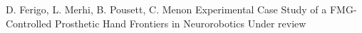 \vspace{1mm}

\begin{cventries}

	\cvpublication
	    {D. Ferigo, L. Merhi, B. Pousett, C. Menon}
	    {Experimental Case Study of a FMG-Controlled Prosthetic Hand}
	    {Frontiers in Neurorobotics}
	    {Under review}

\end{cventries}
